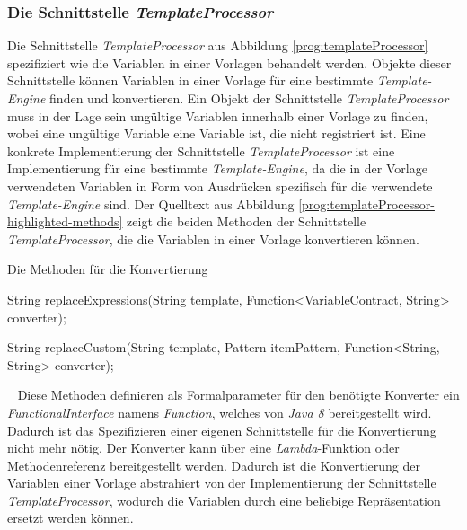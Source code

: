 \subsubsection{Die Schnittstelle \emph{TemplateProcessor}}
\label{sec:templateProcessor}
Die Schnittstelle \emph{TemplateProcessor} aus Abbildung \ref{prog:templateProcessor} spezifiziert wie die Variablen in einer Vorlagen behandelt werden. Objekte dieser Schnittstelle können Variablen in einer Vorlage für eine bestimmte \emph{Template-Engine} finden und konvertieren. Ein Objekt der Schnittstelle \emph{TemplateProcessor} muss in der Lage sein ungültige Variablen innerhalb einer Vorlage zu finden, wobei eine ungültige Variable eine Variable ist, die nicht registriert ist. Eine konkrete Implementierung der Schnittstelle \emph{TemplateProcessor} ist eine Implementierung für eine bestimmte \emph{Template-Engine}, da die in der Vorlage verwendeten Variablen in Form von Ausdrücken spezifisch für die verwendete \emph{Template-Engine} sind. 
\newline
\newline
Der Quelltext aus Abbildung \ref{prog:templateProcessor-highlighted-methods} zeigt die beiden Methoden der Schnittstelle \emph{TemplateProcessor}, die die Variablen in einer Vorlage konvertieren können.
\begin{program}[h]
\caption{Die Methoden für die Konvertierung}
\label{prog:templateProcessor-highlighted-methods}
\begin{JavaCode}[numbers=none]
String replaceExpressions(String template,
                          Function<VariableContract, String> converter);

String replaceCustom(String template,
                     Pattern itemPattern,
                     Function<String, String> converter);
\end{JavaCode}
\end{program}
\ \newline
Diese Methoden definieren als Formalparameter für den benötigte Konverter ein \emph{FunctionalInterface} namens \emph{Function}, welches von \emph{Java 8} bereitgestellt wird. Dadurch ist das Spezifizieren einer eigenen Schnittstelle für die Konvertierung nicht mehr nötig. Der Konverter kann über eine \emph{Lambda}-Funktion oder Methodenreferenz bereitgestellt werden. Dadurch ist die Konvertierung der Variablen einer Vorlage abstrahiert von der Implementierung der Schnittstelle \emph{TemplateProcessor}, wodurch die Variablen durch eine beliebige Repräsentation ersetzt werden können.

